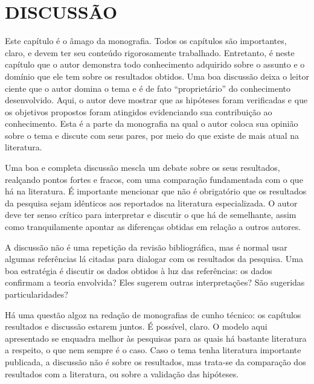 \chapter{DISCUSSÃO}
\thispagestyle{empty}
Este capítulo é o âmago da monografia. Todos os capítulos são importantes, claro, e devem ter seu conteúdo rigorosamente trabalhado. Entretanto, é neste capítulo que o autor demonstra todo conhecimento adquirido sobre o assunto e o domínio que ele tem sobre os resultados obtidos. Uma boa discussão deixa o leitor ciente que o autor domina o tema e é de fato “proprietário” do conhecimento desenvolvido. Aqui, o autor deve mostrar que as hipóteses foram verificadas e que os objetivos propostos foram atingidos evidenciando sua contribuição ao conhecimento. Esta é a parte da monografia na qual o autor coloca sua opinião sobre o tema e discute com seus pares, por meio do que existe de mais atual na literatura.

Uma boa e completa discussão mescla um debate sobre os seus resultados, realçando pontos fortes e fracos, com uma comparação fundamentada com o que há na literatura. É importante mencionar que não é obrigatório que os resultados da pesquisa sejam idênticos aos reportados na literatura especializada. O autor deve ter senso crítico para interpretar e discutir o que há de semelhante, assim como tranquilamente apontar as diferenças obtidas em relação a outros autores.

A discussão não é uma repetição da revisão bibliográfica, mas é normal usar algumas referências lá citadas para dialogar com os resultados da pesquisa. Uma boa estratégia é discutir os dados obtidos à luz das referências: os dados confirmam a teoria envolvida? Eles sugerem outras interpretações? São sugeridas particularidades?

Há uma questão algoz na redação de monografias de cunho técnico: os capítulos resultados e discussão estarem juntos. É possível, claro. O modelo aqui apresentado se enquadra melhor às pesquisas para as quais há bastante literatura a respeito, o que nem sempre é o caso. Caso o tema tenha literatura importante publicada, a discussão não é sobre os resultados, mas trata-se da comparação dos resultados com a literatura, ou sobre a validação das hipóteses.
